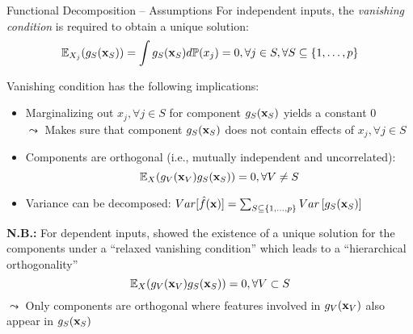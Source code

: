 \documentclass[10pt,compress,t,notes=noshow, xcolor=table]{beamer}
\begin{document}
\begin{frame}{Functional Decomposition -- Assumptions}
For independent inputs, the \textit{vanishing condition} is required to obtain a unique solution:
$$\mathbb{E}_{X_j} (g_{S}(\mathbf{x}_S)) = \int g_{S}(\mathbf{x}_S) d \mathbb{P}(x_j) = 0, \forall j \in S, \forall S \subseteq \{1, \ldots, p\}$$

\pause 

Vanishing condition has the following implications:

\begin{itemize}
    \item Marginalizing out $x_j, \forall j \in S$ for component $g_S(\mathbf{x}_S)$ yields a constant 0\\
    $\leadsto$ Makes sure that component $g_S(\mathbf{x}_S)$ does not contain effects of $x_j, \forall j \in S$
    \item Components are orthogonal (i.e., mutually independent and uncorrelated):
    $$\mathbb{E}_{X} (g_{V}(\mathbf{x}_V) g_{S}(\mathbf{x}_S)) = 0, \forall V \neq S$$
    \item Variance can be decomposed:
$ Var[\hat{f}(\mathbf{x})] =  \textstyle\sum_{S \subseteq \{1,\ldots,p\}}  Var\left[ g_{S}(\mathbf{x}_S)\right]$
\end{itemize}

\pause 

\textbf{N.B.:} For dependent inputs,  showed the existence of a unique solution for the components under a ``relaxed vanishing condition'' which leads to a ``hierarchical orthogonality''
$$\mathbb{E}_{X} (g_{V}(\mathbf{x}_V) g_{S}(\mathbf{x}_S)) = 0, \forall V \subset S$$
$\leadsto$ Only components are orthogonal where features involved in $g_{V}(\mathbf{x}_V)$ also appear in $g_{S}(\mathbf{x}_S)$
\end{frame}
\end{document}
